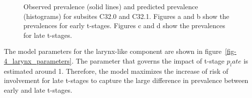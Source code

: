 \documentclass[
  sn-mathphys-num,
]{sn-jnl}
\begin{document}
\begin{figure}
\begin{minipage}{\linewidth}
{}

\subcaption{\label{fig-oral_cavity_C03_late}}

\end{minipage}%
\newline
\begin{minipage}{\linewidth}


\subcaption{\label{fig-oral_cavity_C05_late}}

\end{minipage}%

\caption{\label{fig-larynx_4}Observed prevalence (solid lines) and
predicted prevalence (histograms) for subsites C32.0 and C32.1. Figures
a and b show the prevalences for early t-stages. Figures c and d show
the prevalences for late t-stages.}

\end{figure}%

The model parameters for the larynx-like component are shown in
figure~\ref{fig-4_larynx_parameters}. The parameter that governs the
impact of t-stage \(p_late\) is estimated around 1. Therefore, the model
maximizes the increase of risk of involvement for late t-stages to
capture the large difference in prevalence between early and late
t-stages.
\end{document}
